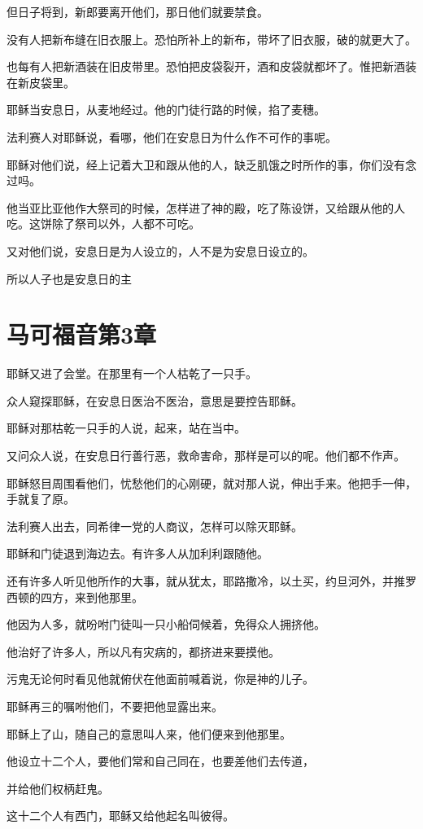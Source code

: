 \documentclass[12pt,oneside]{book}
\begin{document}
但日子将到，新郎要离开他们，那日他们就要禁食。

没有人把新布缝在旧衣服上。恐怕所补上的新布，带坏了旧衣服，破的就更大了。

也每有人把新酒装在旧皮带里。恐怕把皮袋裂开，酒和皮袋就都坏了。惟把新酒装在新皮袋里。

耶稣当安息日，从麦地经过。他的门徒行路的时候，掐了麦穗。

法利赛人对耶稣说，看哪，他们在安息日为什么作不可作的事呢。

耶稣对他们说，经上记着大卫和跟从他的人，缺乏肌饿之时所作的事，你们没有念过吗。

他当亚比亚他作大祭司的时候，怎样进了神的殿，吃了陈设饼，又给跟从他的人吃。这饼除了祭司以外，人都不可吃。

又对他们说，安息日是为人设立的，人不是为安息日设立的。

所以人子也是安息日的主

\chapter{马可福音第3章}
耶稣又进了会堂。在那里有一个人枯乾了一只手。

众人窥探耶稣，在安息日医治不医治，意思是要控告耶稣。

耶稣对那枯乾一只手的人说，起来，站在当中。

又问众人说，在安息日行善行恶，救命害命，那样是可以的呢。他们都不作声。

耶稣怒目周围看他们，忧愁他们的心刚硬，就对那人说，伸出手来。他把手一伸，手就复了原。

法利赛人出去，同希律一党的人商议，怎样可以除灭耶稣。

耶稣和门徒退到海边去。有许多人从加利利跟随他。

还有许多人听见他所作的大事，就从犹太，耶路撒冷，以土买，约旦河外，并推罗西顿的四方，来到他那里。

他因为人多，就吩咐门徒叫一只小船伺候着，免得众人拥挤他。

他治好了许多人，所以凡有灾病的，都挤进来要摸他。

污鬼无论何时看见他就俯伏在他面前喊着说，你是神的儿子。

耶稣再三的嘱咐他们，不要把他显露出来。

耶稣上了山，随自己的意思叫人来，他们便来到他那里。

他设立十二个人，要他们常和自己同在，也要差他们去传道，

并给他们权柄赶鬼。

这十二个人有西门，耶稣又给他起名叫彼得。
\end{document}
